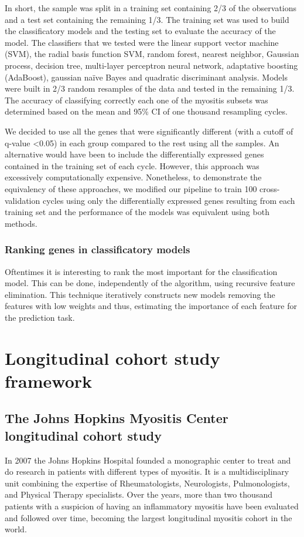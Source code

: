 In short, the sample was split in a training set containing 2/3 of the observations and a test set containing the remaining 1/3. The training set was used to build the classificatory models and the testing set to evaluate the accuracy of the model. The classifiers that we tested were the linear support vector machine (SVM), the radial basis function SVM, random forest, nearest neighbor, Gaussian process, decision tree, multi-layer perceptron neural network, adaptative boosting (AdaBoost), gaussian naïve Bayes and quadratic discriminant analysis. Models were built in 2/3 random resamples of the data and tested in the remaining 1/3. The accuracy of classifying correctly each one of the myositis subsets was determined based on the mean and 95\% CI of one thousand resampling cycles.

We decided to use all the genes that were significantly different (with a cutoff of q-value <0.05) in each group compared to the rest using all the samples. An alternative would have been to include the differentially expressed genes contained in the training set of each cycle. However, this approach was excessively computationally expensive. Nonetheless, to demonstrate the equivalency of these approaches, we modified our pipeline to train 100 cross-validation cycles using only the differentially expressed genes resulting from each training set and the performance of the models was equivalent using both methods.

\subsubsection{Ranking genes in classificatory models}
Oftentimes it is interesting to rank the most important for the classification model. This can be done, independently of the algorithm, using recursive feature elimination.\cite{Guyon2002} This technique iteratively constructs new models removing the features with low weights and thus, estimating the importance of each feature for the prediction task.


\section{Longitudinal cohort study framework}

\subsection{The Johns Hopkins Myositis Center longitudinal cohort study}
In 2007 the Johns Hopkins Hospital founded a monographic center to treat and do research in patients with different types of myositis. It is a multidisciplinary unit combining the expertise of Rheumatologists, Neurologists, Pulmonologists, and Physical Therapy specialists. Over the years, more than two thousand patients with a suspicion of having an inflammatory myositis have been evaluated and followed over time, becoming the largest longitudinal myositis cohort in the world.

